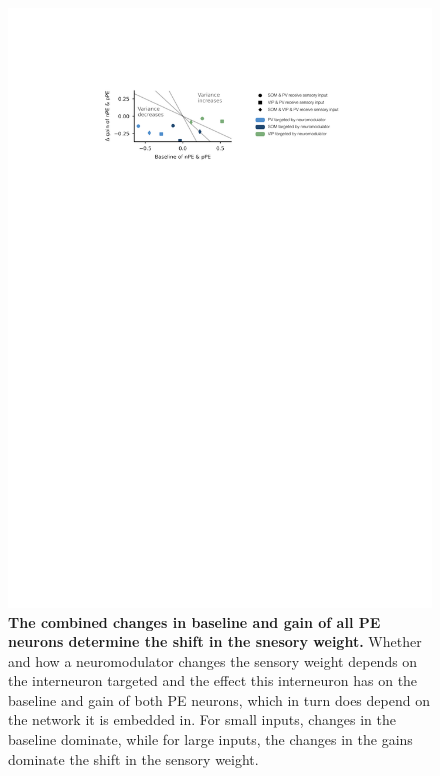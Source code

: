 \documentclass[10pt,a4paper,draft]{article}
\begin{document}
\begin{figure}[!h]
	\centering
    \includegraphics{../results/figures/final/Fig_4_S4}%
\caption{\footnotesize{\bf The combined changes in baseline and gain of all PE neurons determine the shift in the snesory weight.\newline}  
Whether and how a neuromodulator changes the sensory weight depends on the interneuron targeted and the effect this interneuron has on the baseline and gain of both PE neurons, which in turn does depend on the network it is embedded in. For small inputs, changes in the baseline dominate, while for large inputs, the changes in the gains dominate the shift in the sensory weight.
}
\label{fig:Fig_4_S4}
\end{figure}
\end{document}
